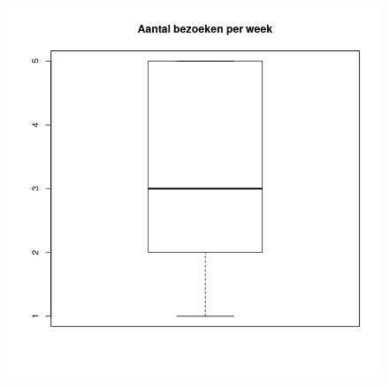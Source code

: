 \documentclass{beamer}
\begin{document}
\begin{frame}
\begin{columns}
    \begin{column}{0.5\textwidth}
      \begin{figure}
        \centering
        \includegraphics[width=1.00\textwidth]{img/2var-boxplot-aantalbezoeken}
      \end{figure}
    \end{column}
  
  \end{columns}
\end{frame}
\end{document}
